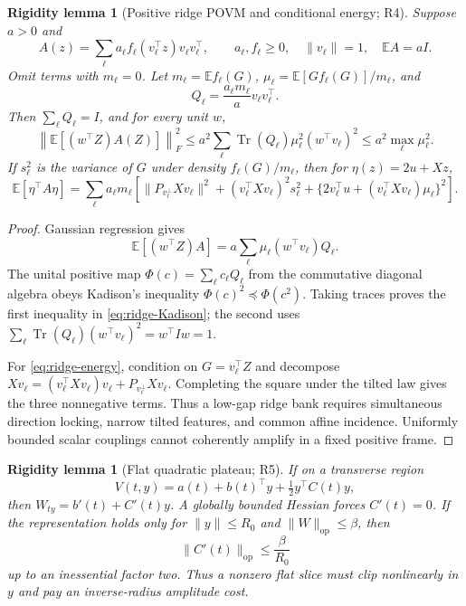 \documentclass[11pt]{article}
\numberwithin{equation}{section}
\newtheorem{rigidity}[theorem]{Rigidity lemma}
\DeclareMathOperator{\Tr}{Tr}
\newcommand{\E}{\mathbb E}
\newcommand{\op}{\mathrm{op}}
\begin{document}
\begin{rigidity}[Positive ridge POVM and conditional energy; R4]
\label{rig:ridge}
Suppose $a>0$ and
\begin{equation}\label{eq:ridge-A}
 A(z)=\sum_\ell a_\ell f_\ell(v_\ell^\top z)v_\ell v_\ell^\top,\qquad
 a_\ell,f_\ell\ge0,\quad\|v_\ell\|=1,\quad \E A=aI.
\end{equation}
Omit terms with $m_\ell=0$.  Let $m_\ell=\E f_\ell(G)$,
$\mu_\ell=\E[Gf_\ell(G)]/m_\ell$, and
\[
 Q_\ell=\frac{a_\ell m_\ell}{a}v_\ell v_\ell^\top.
\]
Then $\sum_\ell Q_\ell=I$, and for every unit $w$,
\begin{equation}\label{eq:ridge-Kadison}
 \left\|\E[(w^\top Z)A(Z)]\right\|_F^2
 \le a^2\sum_\ell\Tr(Q_\ell)\mu_\ell^2(w^\top v_\ell)^2
 \le a^2\max_\ell\mu_\ell^2.
\end{equation}
If $s_\ell^2$ is the variance of $G$ under density
$f_\ell(G)/m_\ell$, then for $\eta(z)=2u+Xz$,
\begin{equation}\label{eq:ridge-energy}
 \E[\eta^\top A\eta]
 =\sum_\ell a_\ell m_\ell\left[
 \|P_{v_\ell^\perp}Xv_\ell\|^2
 +(v_\ell^\top Xv_\ell)^2s_\ell^2
 +\{2v_\ell^\top u+(v_\ell^\top Xv_\ell)\mu_\ell\}^2
 \right].
\end{equation}
\end{rigidity}

\begin{proof}
Gaussian regression gives
\[
 \E[(w^\top Z)A]=a\sum_\ell\mu_\ell(w^\top v_\ell)Q_\ell.
\]
The unital positive map $\Phi(c)=\sum_\ell c_\ell Q_\ell$ from the
commutative diagonal algebra obeys Kadison's inequality
$\Phi(c)^2\preceq\Phi(c^2)$.  Taking traces proves the first inequality in
\eqref{eq:ridge-Kadison}; the second uses
$\sum_\ell\Tr(Q_\ell)(w^\top v_\ell)^2=w^\top Iw=1$.

For \eqref{eq:ridge-energy}, condition on $G=v_\ell^\top Z$ and decompose
$Xv_\ell=(v_\ell^\top Xv_\ell)v_\ell+P_{v_\ell^\perp}Xv_\ell$.
Completing the square under the tilted law gives the three nonnegative terms.
Thus a low-gap ridge bank requires simultaneous direction locking, narrow
tilted features, and common affine incidence.  Uniformly bounded scalar
couplings cannot coherently amplify in a fixed positive frame.
\end{proof}

\begin{rigidity}[Flat quadratic plateau; R5]\label{rig:plateau}
If on a transverse region
\[
 V(t,y)=a(t)+b(t)^\top y+\tfrac12y^\top C(t)y,
\]
then $W_{ty}=b'(t)+C'(t)y$.  A globally bounded Hessian forces
$C'(t)=0$.  If the representation holds only for $\|y\|\le R_0$ and
$\|W\|_{\op}\le\beta$, then
\begin{equation}\label{eq:plateau-cap}
 \|C'(t)\|_{\op}\le\frac{\beta}{R_0}
\end{equation}
up to an inessential factor two.  Thus a nonzero flat slice must clip
nonlinearly in $y$ and pay an inverse-radius amplitude cost.
\end{rigidity}
\end{document}
